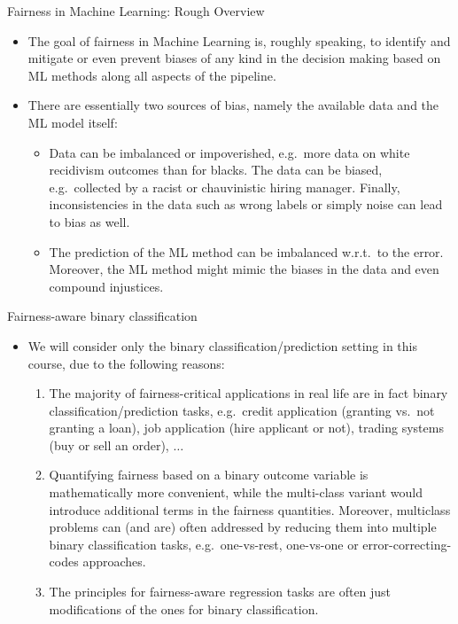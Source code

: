 \begin{vbframe}{Fairness in Machine Learning: Rough Overview}
%
  \begin{itemize}
%    
    \item The goal of fairness in Machine Learning is, roughly speaking, to identify and mitigate or even prevent biases of any kind in the decision making based on ML methods along all aspects of the pipeline.
%    
	\item There are essentially two sources of bias, namely the available data and the ML model itself:
%	
	\begin{itemize}
%		
		\item Data can be imbalanced or impoverished, e.g.\ more data on white recidivism outcomes than for blacks. The data can be biased, e.g.\ collected by a racist or chauvinistic hiring manager. Finally, inconsistencies in the data such as wrong labels or simply noise can lead to bias as well.
%		
		\item The prediction of the ML method can be imbalanced w.r.t.\ to the error. Moreover, the ML method might mimic the biases in the data and even compound injustices.
%
	\end{itemize}
%
  \end{itemize}
%
\end{vbframe}

\begin{vbframe}{Fairness-aware binary classification}
%	
\begin{itemize}
%	
\small
\item  We will consider only the binary classification/prediction setting in this course, due to the following reasons:
	\begin{enumerate}
		\small
%		
		\item The majority of fairness-critical applications in real life are in fact binary classification/prediction tasks, e.g.\ credit application (granting vs.\ not granting a loan), job application (hire applicant or not), trading systems (buy or sell an order), $\ldots$
%		
		\item Quantifying fairness based on a binary outcome variable is mathematically more convenient, while the multi-class
		variant would introduce additional terms in the fairness quantities. Moreover, multiclass problems can (and are) often addressed by reducing them into multiple binary classification tasks, e.g.\ one-vs-rest, one-vs-one or error-correcting-codes approaches.
%
		\item The principles for fairness-aware regression tasks are often just modifications of the ones for binary classification.
%
	\end{enumerate}
%    
\end{itemize} 
%
\end{vbframe}


